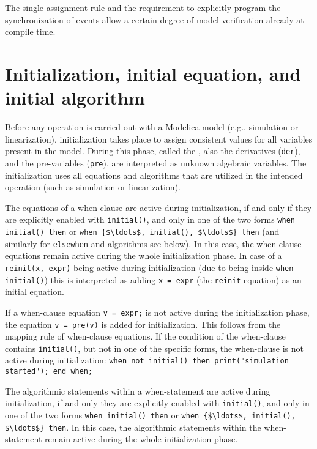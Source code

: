 \begin{nonnormative}
The single assignment rule and the requirement to explicitly
program the synchronization of events allow a certain degree of model
verification already at compile time.
\end{nonnormative}

\section{Initialization, initial equation, and initial algorithm}\label{initialization-initial-equation-and-initial-algorithm}

Before any operation is carried out with a Modelica model (e.g., simulation or linearization), initialization takes place to assign consistent values for all variables present in the model.
During this phase, called the , also the derivatives (\lstinline!der!), and the pre-variables (\lstinline!pre!), are interpreted as unknown algebraic variables.
The initialization uses all equations and algorithms that are utilized in the intended operation (such as simulation or linearization).

The equations of a when-clause are active during initialization, if and only if they are explicitly enabled with \lstinline!initial()!, and only in one of the two forms
\lstinline!when initial() then! or \lstinline!when {$\ldots$, initial(), $\ldots$} then! (and similarly for \lstinline!elsewhen! and algorithms see below).  In this case, the when-clause equations remain active during the
whole initialization phase.  In case of a \lstinline!reinit(x, expr)! being active during initialization (due to being inside \lstinline!when initial()!) this is interpreted as adding
\lstinline!x = expr! (the \lstinline!reinit!-equation) as an initial equation.

\begin{nonnormative}
If a when-clause equation \lstinline!v = expr;! is not active during the initialization phase, the equation \lstinline!v = pre(v)! is added for
initialization.  This follows from the mapping rule of when-clause equations.  If the condition of the when-clause contains \lstinline!initial()!,
but not in one of the specific forms, the when-clause is not active during initialization: \lstinline!when not initial() then print("simulation started"); end when;!
\end{nonnormative}

The algorithmic statements within a when-statement are active during initialization, if and only they are explicitly enabled with \lstinline!initial()!, and only in one of the two forms
\lstinline!when initial() then! or \lstinline!when {$\ldots$, initial(), $\ldots$} then!. In this case, the algorithmic statements within the when-statement remain active during the whole
initialization phase.

